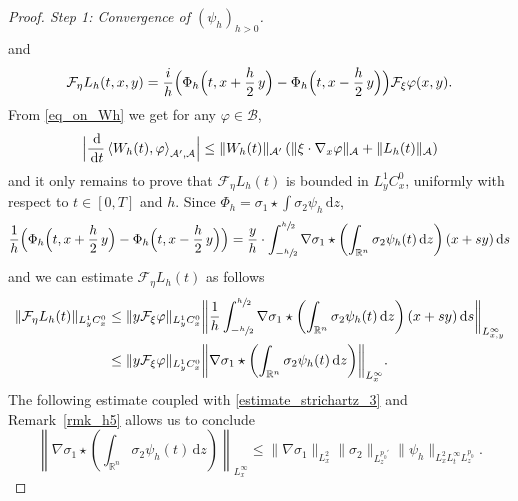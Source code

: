 \documentclass[JEP,XML,SOM,NoEqCountersInSection,NoFloatCountersInSection,Unicode,published]{cedram}
\theoremstyle{definition}
\newcommand{\R}{\mathbb{R}}
\newcommand{\ud}{\, {\mathrm{d}}}
\begin{document}
\begin{proof}[Proof. Step 1: Convergence of $(\psi_{h})_{h>0}$]
\begin{align*}
\end{align*}
and
\[
\mathcal{F}_{\eta}L_{h}(t,x,y)=\frac{i}{h}\Bigl(\Phi_{h}\Bigl(t,x+\frac{h}{2}\,y\Bigr)-\Phi_{h}\Bigl(t,x-\frac{h}{2}\,y\Bigr)\Bigr)\mathcal{F}_{\xi}\varphi(x,y).
\]
From \eqref{eq_on_Wh} we get for any $\varphi\in\mathcal{B}$,
\[
\Bigl|\frac{\ud}{\ud t}\left\langle W_{h}(t),\varphi\right\rangle_{\mathcal{A}',\mathcal{A}}\Bigr|\leq\|W_{h}(t)\|_{\mathcal{A}'}\left(\|\xi\cdot\nabla_{x}\varphi\|_{\mathcal{A}}+\|L_{h}(t)\|_{\mathcal{A}}\right)
\]
and it only remains to prove that $\mathcal{F}_{\eta}L_{h}(t)$ is bounded in $L_{y}^{1}C_{x}^{0}$, uniformly with respect to $t\in[0,T]$ and $h$. Since $\Phi_{h}=\sigma_{1}\star\int\sigma_{2}\psi_{h}\ud z$,
\[
\frac{1}{h}\Bigl(\Phi_{h}\Bigl(t,x+\frac{h}{2}\,y\Bigr)-\Phi_{h}\Bigl(t,x-\frac{h}{2}\,y\Bigr)\Bigr)=\frac{y}{h}\cdot\int_{-\sfrac{h}{2}}^{\sfrac{h}{2}}\nabla\sigma_{1}\star\left(\int_{\R^{n}}\sigma_{2}\psi_{h}(t)\ud z\right)(x+sy)\ud s
\]
and we can estimate $\mathcal{F}_{\eta}L_{h}(t)$ as follows
\begin{align*}
\|\mathcal{F}_{\eta}L_{h}(t)\|_{L_{y}^{1}C_{x}^{0}}&\leq\|y\mathcal{F}_{\xi}\varphi\|_{L_{y}^{1}C_{x}^{0}}\biggl\|\frac{1}{h}\int_{-\sfrac{h}{2}}^{\sfrac{h}{2}}\nabla\sigma_{1}\star\left(\int_{\R^{n}}\sigma_{2}\psi_{h}(t)\ud z\right)(x+sy)\ud s\biggr\|_{L_{x,y}^{\infty}}\\
&\leq\|y\mathcal{F}_{\xi}\varphi\|_{L_{y}^{1}C_{x}^{0}}\biggl\|\nabla\sigma_{1}\star\left(\int_{\R^{n}}\sigma_{2}\psi_{h}(t)\ud z\right)\biggr\|_{L_{x}^{\infty}}.
\end{align*}
The following estimate coupled with \eqref{estimate_strichartz_3} and Remark~\ref{rmk_h5} allows us to conclude
\[
\left\|\nabla\sigma_{1}\star\left(\int_{\R^{n}}\sigma_{2}\psi_{h}(t)\ud z\right)\right\|_{L_{x}^{\infty}}\leq\|\nabla\sigma_{1}\|_{L_{x}^{2}}\|\sigma_{2}\|_{L_{z}^{p_{0}'}}\|\psi_{h}\|_{L_{x}^{2}L_{t}^{\infty}L_{z}^{p_{0}}}.
\]


\end{proof}
\end{document}
